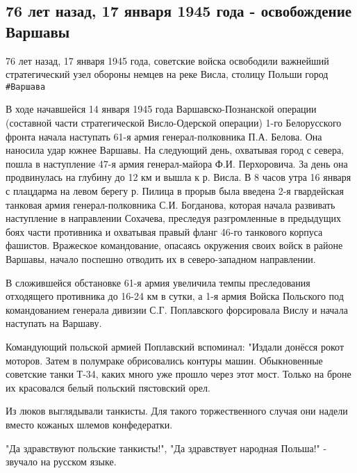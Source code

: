  
 
 
 
 
\subsection{76 лет назад, 17 января 1945 года - освобождение Варшавы}

76 лет назад, 17 января 1945 года, советские войска освободили важнейший
стратегический узел обороны немцев на реке Висла, столицу Польши город \verb|#Варшава| 

В ходе начавшейся 14 января 1945 года Варшавско-Познанской операции (составной
части стратегической Висло-Одерской операции) 1-го Белорусского фронта начала
наступать 61-я армия генерал-полковника П.А. Белова. Она наносила удар южнее
Варшавы. На следующий день, охватывая город с севера, пошла в наступление 47-я
армия генерал-майора Ф.И. Перхоровича. За день она продвинулась на глубину до
12 км и вышла к р. Висла. В 8 часов утра 16 января с плацдарма на левом берегу
р. Пилица в прорыв была введена 2-я гвардейская танковая армия
генерал-полковника С.И. Богданова, которая начала развивать наступление в
направлении Сохачева, преследуя разгромленные в предыдущих боях части
противника и охватывая правый фланг 46-го танкового корпуса фашистов. Вражеское
командование, опасаясь окружения своих войск в районе Варшавы, начало поспешно
отводить их в северо-западном направлении. 

В сложившейся обстановке 61-я армия увеличила темпы преследования отходящего
противника до 16-24 км в сутки, а 1-я армия Войска Польского под командованием
генерала дивизии С.Г. Поплавского форсировала Вислу и начала наступать на
Варшаву. 

Командующий польской армией Поплавский вспоминал: "Издали донёсся рокот
моторов. Затем в полумраке обрисовались контуры машин. Обыкновенные советские
танки Т-34, каких много уже прошло через этот мост. Только на броне их
красовался белый польский пястовский орел. 

Из люков выглядывали танкисты. Для такого торжественного случая они надели вместо кожаных шлемов конфедератки. 

"Да здравствуют польские танкисты!", "Да здравствует народная Польша!" - звучало на русском языке. 


